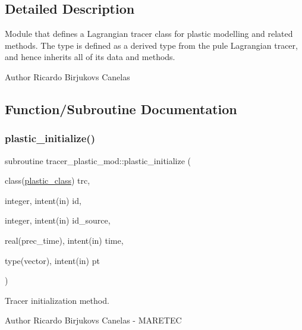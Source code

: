 \subsection{Detailed Description}
Module that defines a Lagrangian tracer class for plastic modelling and related methods. The type is defined as a derived type from the pule Lagrangian tracer, and hence inherits all of it\textquotesingle{}s data and methods. 

\begin{DoxyAuthor}{Author}
Ricardo Birjukovs Canelas 
\end{DoxyAuthor}


\subsection{Function/\+Subroutine Documentation}
\mbox{\label{namespacetracer__plastic__mod_a42882cd86cfe30f341d8150582a664a9}} 
\subsubsection{\texorpdfstring{plastic\+\_\+initialize()}{plastic\_initialize()}}
{\footnotesize\ttfamily subroutine tracer\+\_\+plastic\+\_\+mod\+::plastic\+\_\+initialize (\begin{DoxyParamCaption}\item[{class(\mbox{\hyperlink{structtracer__plastic__mod_1_1plastic__class}{plastic\+\_\+class}})}]{trc,  }\item[{integer, intent(in)}]{id,  }\item[{integer, intent(in)}]{id\+\_\+source,  }\item[{real(prec\+\_\+time), intent(in)}]{time,  }\item[{type(vector), intent(in)}]{pt }\end{DoxyParamCaption})\hspace{0.3cm}{\ttfamily [private]}}



Tracer initialization method. 

\begin{DoxyAuthor}{Author}
Ricardo Birjukovs Canelas -\/ M\+A\+R\+E\+T\+EC 
\end{DoxyAuthor}


